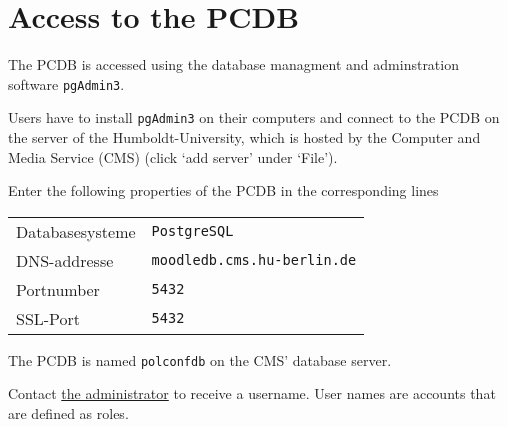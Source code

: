 \section{Access to the PCDB}\label{sec_access_the_PCDB}
The PCDB is accessed using the database managment and adminstration software  \texttt{\footnotesize pgAdmin3}.

Users have to install \texttt{\footnotesize pgAdmin3} on their computers and connect to the PCDB on the server of the Humboldt-University, which is hosted by the Computer and Media Service (CMS) (click `add server' under `File').

Enter the following properties of the PCDB in the corresponding lines

\begin{table}[!h]
\begin{tabular}{l l}
Databasesysteme & \texttt{\footnotesize PostgreSQL} \\
DNS-addresse & \texttt{\footnotesize moodledb.cms.hu-berlin.de} \\
Portnumber & \texttt{\footnotesize 5432} \\
SSL-Port & \texttt{\footnotesize 5432} \\
\end{tabular}
\end{table}

The PCDB is named \texttt{\footnotesize polconfdb} on the CMS' database server.

Contact \href{mailto:orlowskm@hu-berlin.de}{the administrator} to receive a username.
User names are accounts that are defined as roles.

	

